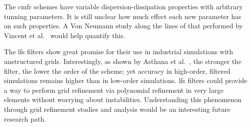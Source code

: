 The \gls{cmfr} schemes have variable dispersion-dissipation properties with arbitrary tunning parameters. It is still unclear how much effect each new parameter has on such properties. A Von Neumann study along the lines of that performed by Vincent et al.~\cite{vincent2011insights} would help quantify this.

The \gls{lfs} filters show great promise for their use in industrial simulations with unstructured grids. Interestingly, as shown by Asthana et al.~\cite{asthana2014}, the stronger the filter, the lower the order of the scheme; yet accuracy in high-order, filtered simulations remains higher than in low-order simulations. \gls{lfs} filters could provide a way to perform grid refinement via polynomial refinement in very large elements without worrying about instabilities. Understanding this phenomenon through grid refinement studies and analysis would be an interesting future research path.

